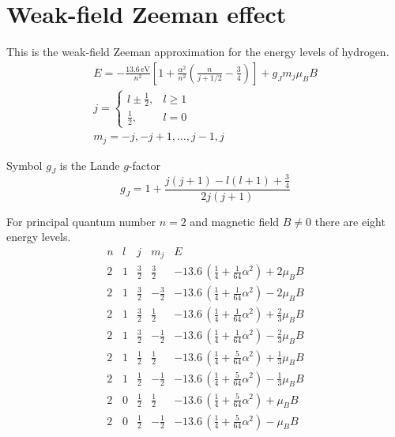 

\section*{Weak-field Zeeman effect}

This is the weak-field Zeeman approximation for the energy levels of hydrogen.
\begin{gather*}
E=-\frac{13.6\,\text{eV}}{n^2}
\left[
1+\frac{\alpha^2}{n^2}\left(\frac{n}{j+1/2}-\frac{3}{4}\right)
\right]+g_Jm_j\mu_BB
\\[2ex]
j=\begin{cases}
l\pm\frac{1}{2}, & l\ge1
\\
\frac{1}{2}, & l=0
\end{cases}
\\[2ex]
m_j=-j,-j+1,\ldots,j-1,j
\end{gather*}

Symbol $g_J$ is the Lande $g$-factor
\begin{equation*}
g_J=1+\frac{j(j+1)-l(l+1)+\frac{3}{4}}{2j(j+1)}
\end{equation*}

For principal quantum number $n=2$ and magnetic field $B\ne0$ there are eight energy levels.
\begin{equation*}
\begin{matrix}
n & l & j & m_j & E
\\[2ex]
2 & 1 & \frac{3}{2} & \frac{3}{2} &
-13.6\,\left(\tfrac{1}{4}+\tfrac{1}{64}\alpha^2\right)+2\mu_BB
\\[1ex]
2 & 1 & \frac{3}{2} & -\frac{3}{2} &
-13.6\,\left(\tfrac{1}{4}+\tfrac{1}{64}\alpha^2\right)-2\mu_BB
\\[2ex]
2 & 1 & \frac{3}{2} & \frac{1}{2} &
-13.6\,\left(\tfrac{1}{4}+\tfrac{1}{64}\alpha^2\right)+\frac{2}{3}\mu_BB
\\[1ex]
2 & 1 & \frac{3}{2} & -\frac{1}{2} &
-13.6\,\left(\tfrac{1}{4}+\tfrac{1}{64}\alpha^2\right)-\frac{2}{3}\mu_BB
\\[2ex]
2 & 1 & \frac{1}{2} & \frac{1}{2} &
-13.6\,\left(\tfrac{1}{4}+\tfrac{5}{64}\alpha^2\right)+\frac{1}{3}\mu_BB
\\[1ex]
2 & 1 & \frac{1}{2} & -\frac{1}{2} &
-13.6\,\left(\tfrac{1}{4}+\tfrac{5}{64}\alpha^2\right)-\frac{1}{3}\mu_BB
\\[2ex]
2 & 0 & \frac{1}{2} & \frac{1}{2} &
-13.6\,\left(\tfrac{1}{4}+\tfrac{5}{64}\alpha^2\right)+\mu_BB
\\[1ex]
2 & 0 & \frac{1}{2} & -\frac{1}{2} &
-13.6\,\left(\tfrac{1}{4}+\tfrac{5}{64}\alpha^2\right)-\mu_BB
\end{matrix}
\end{equation*}


